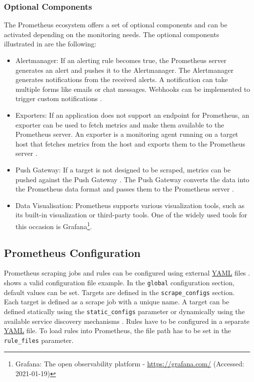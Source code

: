 \subsubsection{Optional Components}
The Prometheus ecosystem offers a set of optional components and can be activated depending on the monitoring needs.
The optional components illustrated in  are the following:

\begin{itemize}
\item Alertmanager:
If an alerting rule becomes true, the Prometheus server generates an alert and pushes it to the Alertmanager. The Alertmanager generates notifications from the received alerts. A notification can take multiple forms like emails or chat messages. Webhooks can be implemented to trigger custom notifications \cite{Bastos2019Prom}.

\item Exporters:
If an application does not support an endpoint for Prometheus, an exporter can be used to fetch metrics and make them available to the Prometheus server. An exporter is a monitoring agent running on a target host that fetches metrics from the host and exports them to the Prometheus server \cite{Pandey2020Monitoring}.

\item Push Gateway:
If a target is not designed to be scraped, metrics can be pushed against the Push Gateway \cite{Prom2020Docs}. The Push Gateway converts the data into the Prometheus data format and passes them to the Prometheus server \cite{Pandey2020Monitoring}.

\item Data Visualisation:
Prometheus supports various visualization tools, such as its built-in visualization or third-party tools. One of the widely used tools for this occasion is Grafana\footnote{Grafana: The open observability platform - \url{https://grafana.com/} (Accessed: 2021-01-19)}.
\end{itemize}


\subsection{Prometheus Configuration}
\label{sec:04_prom_config}
Prometheus scraping jobs and rules can be configured using external \hyperlink{abbr:yml}{YAML} files \cite{Prom2020Docs}.
 shows a valid configuration file example.
In the \texttt{global} configuration section, default values can be set.
Targets are defined in the \texttt{scrape\_configs} section. Each target is defined as a scrape job with a unique name.  A target can be defined statically using the \texttt{static\_configs} parameter or dynamically using the available service discovery mechanisms \cite{Prom2020Docs}.
Rules have to be configured in a separate \hyperlink{abbr:yml}{YAML} file. To load rules into Prometheus, the file path has to be set in the \texttt{rule\_files} parameter.

